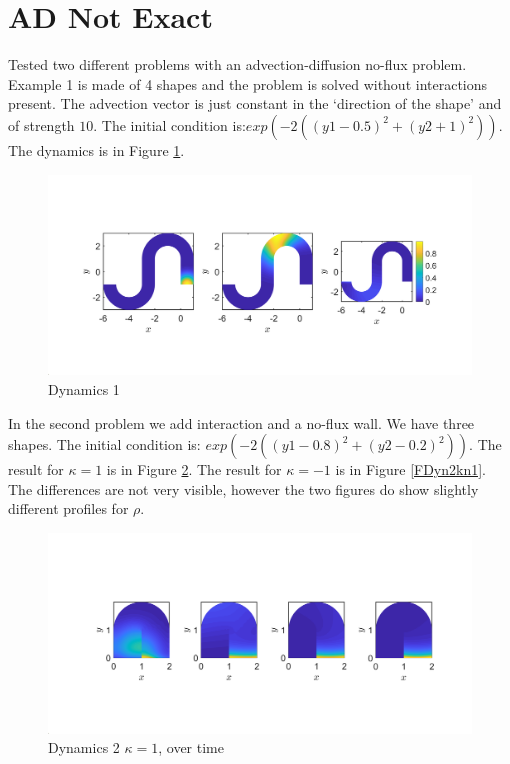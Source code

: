 \documentclass[11pt, a4paper]{article}
\theoremstyle{definition}
\begin{document}
\section{AD Not Exact}
Tested two different problems with an advection-diffusion no-flux problem. Example 1 is made of 4 shapes and the problem is solved without interactions present.
The advection vector is just constant in the `direction of the shape' and of strength $10$. The initial condition is:$exp(-2((y1 - 0.5 )^2 + (y2 + 1)^2))$. The dynamics is in Figure \ref{FDyn1}.
   \begin{figure}[h]
	\centering
	\includegraphics[scale=0.35]{Dyn1.png}
	\caption{Dynamics 1} 
	\label{FDyn1}
\end{figure}
In the second problem we add interaction and a no-flux wall. We have three shapes. The initial condition is: $exp(-2((y1 - 0.8)^2 + (y2 -0.2)^2))$. The result for $\kappa = 1$ is in Figure \ref{FDyn2k1}. The result for $\kappa = - 1$ is in Figure \ref{FDyn2kn1}. The differences are not very visible, however the two figures do show slightly different profiles for $\rho$.
   \begin{figure}[h]
	\centering
	\includegraphics[scale=0.35]{Dyn2k1.png}
	\caption{Dynamics 2 $\kappa = 1$, over time} 
	\label{FDyn2k1}
\end{figure}
\end{document}
